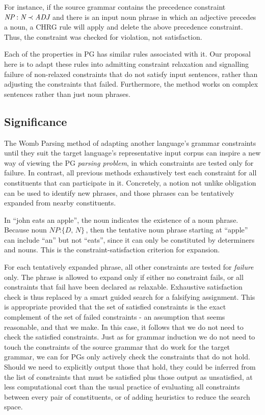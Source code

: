 \documentclass{llncs}
\newcommand{\constituency}[2]{\textit{#1} : \textit{#2}}
\newcommand{\precedence}[3]{\textit{#1} : \textit{#2} \prec \textit{#3}}
\newcommand{\NP}{\textit{NP}\xspace}
\newcommand{\N}{\textit{N}\xspace}
\newcommand{\ADJ}{\textit{ADJ}\xspace}
\begin{document}
For instance, if the source grammar contains the precedence constraint $\precedence{\NP}{\N}{\ADJ}$
and there is an input noun phrase in which an adjective precedes a noun, a CHRG rule will apply and delete the above precedence constraint. Thus, the constraint was checked for violation, not satisfaction.

Each of the properties in PG has similar rules associated with it. Our proposal here is to adapt these rules into admitting constraint relaxation and signalling failure of non-relaxed constraints that do not satisfy input sentences, rather than adjusting the constraints that failed. Furthermore, the method works on complex sentences rather than just noun phrases.

\subsection{Significance}

The Womb Parsing method of adapting another language's grammar constraints  until they suit the target language's representative input corpus can inspire a new way of viewing the PG \emph{parsing problem}, in which  constraints are tested only for failure. In contrast, all previous methods exhaustively test each constraint for all constituents that can participate in it. Concretely, a notion  not unlike obligation can be used to identify new phrases, and those phrases can be tentatively expanded from nearby constituents.

\begin{example}In ``john eats an apple'', the noun indicates the existence of a noun phrase. Because noun $\constituency{NP}{\{D, N\}}$, then the tentative noun phrase starting at ``apple'' can include ``an'' but not ``eats'', since it can only be constituted by determiners and nouns. This is the constraint-satisfaction criterion for expansion.
\end{example}

For each tentatively expanded phrase, all other constraints are tested for \emph{failure} only. The phrase is allowed to expand only if either no constraint fails, or all constraints that fail have been declared as relaxable. Exhaustive satisfaction check is thus replaced by a smart guided search for a falsifying assignment. This is appropriate provided that  the set of satisfied constraints is the exact complement of the set of failed constraints - an assumption that seems reasonable, and that we make. In this case, it follows that we do not need to check the satisfied constraints.  Just as for grammar induction we do not need to touch the constraints of the source grammar that do work for the target grammar,  we can for PGs  only actively check  the constraints that do not hold. Should we need to explicitly output those that hold, they could be inferred  from the list of constraints that must be satisfied plus those output as unsatisfied, at less computational cost than the usual practice of evaluating  all constraints between every pair of constituents, or of adding heuristics to reduce the search space.
\end{document}
